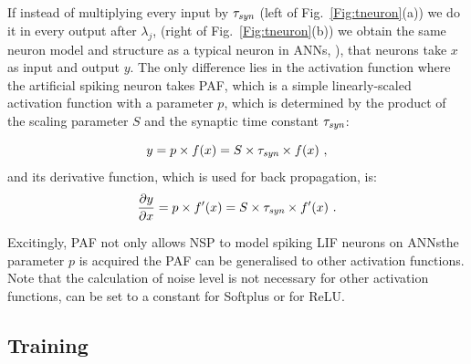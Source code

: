 	
	If instead of multiplying every input by $\tau_{\textit{\textrm{syn}}}$ (left of Fig.~\ref{Fig:tneuron}(a)) we do it in every output after $\lambda_j$, (right of Fig.~\ref{Fig:tneuron}(b)) we obtain the same neuron model and structure as a typical neuron in ANNs, \DIFdelbegin {}\DIFdelend \DIFaddbegin {}\DIFaddend ), that neurons take $x$ as input and output $y$.
	The only difference lies in the activation function where the artificial spiking neuron takes PAF, which is a simple linearly-scaled activation function with a parameter $p$, which is determined by the product of the scaling parameter $S$ and the synaptic time constant $\tau_{\textit{\textrm{syn}}}$:

	\begin{equation}
	y = p \times f(x) = S \times \tau_{\textit{\textrm{syn}}} \times f(x)~,
	\label{equ:PAF}
	\end{equation}
	and its derivative function, which is used for back propagation, is:
	\begin{equation}
	\frac{\partial y}{\partial x} = p \times f'(x) = S \times \tau_{\textit{\textrm{syn}}} \times f'(x)~.
	\end{equation}

	Excitingly, PAF not only allows NSP to model spiking LIF neurons on ANNs\DIFdelbegin {}\DIFdelend \DIFaddbegin {}\DIFaddend the parameter $p$ is acquired the PAF can be generalised to other \DIFaddbegin {}\DIFaddend activation functions.
	\DIFaddbegin {}\DIFaddend Note that the calculation of noise level is not necessary for other activation functions, \DIFdelbegin {}\DIFdelend \DIFaddbegin {}\DIFaddend can be set to a constant for Softplus or \DIFaddbegin {} for ReLU.
	\DIFaddbegin 

	\DIFaddend \subsection{\DIFdelbegin {}\DIFdelend Training \DIFaddbegin {}\DIFaddend }
	\label{subsec:ns_train}

